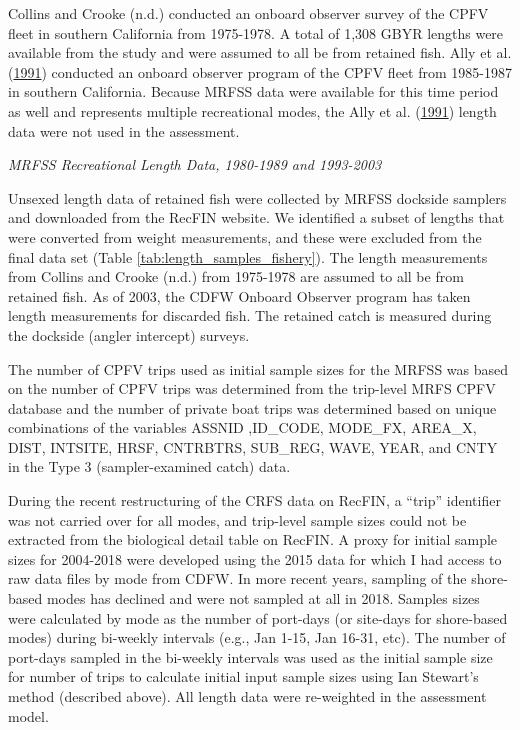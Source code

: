 \documentclass[12pt,]{article}
\begin{document}
Collins and Crooke (n.d.) conducted an onboard observer survey of the
CPFV fleet in southern California from 1975-1978. A total of 1,308 GBYR
lengths were available from the study and were assumed to all be from
retained fish. Ally et al. (\protect\hyperlink{ref-Ally1991}{1991})
conducted an onboard observer program of the CPFV fleet from 1985-1987
in southern California. Because MRFSS data were available for this time
period as well and represents multiple recreational modes, the Ally et
al. (\protect\hyperlink{ref-Ally1991}{1991}) length data were not used
in the assessment.

\emph{MRFSS Recreational Length Data, 1980-1989 and 1993-2003}

Unsexed length data of retained fish were collected by MRFSS dockside
samplers and downloaded from the RecFIN website. We identified a subset
of lengths that were converted from weight measurements, and these were
excluded from the final data set (Table
\ref{tab:length_samples_fishery}). The length measurements from Collins
and Crooke (n.d.) from 1975-1978 are assumed to all be from retained
fish. As of 2003, the CDFW Onboard Observer program has taken length
measurements for discarded fish. The retained catch is measured during
the dockside (angler intercept) surveys.

The number of CPFV trips used as initial sample sizes for the MRFSS was
based on the number of CPFV trips was determined from the trip-level
MRFS CPFV database and the number of private boat trips was determined
based on unique combinations of the variables ASSNID ,ID\_CODE,
MODE\_FX, AREA\_X, DIST, INTSITE, HRSF, CNTRBTRS, SUB\_REG, WAVE, YEAR,
and CNTY in the Type 3 (sampler-examined catch) data.

During the recent restructuring of the CRFS data on RecFIN, a ``trip''
identifier was not carried over for all modes, and trip-level sample
sizes could not be extracted from the biological detail table on RecFIN.
A proxy for initial sample sizes for 2004-2018 were developed using the
2015 data for which I had access to raw data files by mode from CDFW. In
more recent years, sampling of the shore-based modes has declined and
were not sampled at all in 2018. Samples sizes were calculated by mode
as the number of port-days (or site-days for shore-based modes) during
bi-weekly intervals (e.g., Jan 1-15, Jan 16-31, etc). The number of
port-days sampled in the bi-weekly intervals was used as the initial
sample size for number of trips to calculate initial input sample sizes
using Ian Stewart's method (described above). All length data were
re-weighted in the assessment model.
\end{document}

